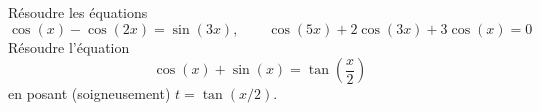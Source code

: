 \documentclass{magnolia}
\begin{document}



\begin{questions}
\question Résoudre les équations \[\cos(x)-\cos(2x)=\sin(3x), \qquad \cos(5x)+2\cos (3x)+3\cos(x)=0\]
\question Résoudre l'équation
  \[\cos(x)+\sin(x)=\tan \left( \frac{x}{2} \right)\]
  en posant (soigneusement) $t=\tan(x/2)$.
\end{questions}
\end{document}
